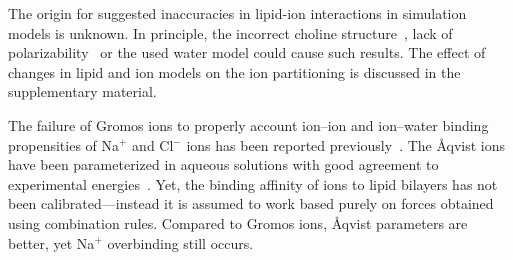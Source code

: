 \documentclass[pre,aps,floatfix,authordate1-4,twocolumn]{revtex4-1}
\begin{document}

The origin for suggested inaccuracies in lipid-ion interactions in simulation models is unknown. 
In principle, the incorrect choline structure~\cite{botan15}, lack of polarizability~\cite{leontyev11} or
the used water model could cause such results. The effect of changes in lipid and ion models on the ion
partitioning is discussed in the supplementary material.

The failure
 of Gromos ions to properly account ion--ion and ion--water binding propensities of Na$^+$ and Cl$^-$ ions has been
 reported previously~\cite{Reif13}. The \r{A}qvist ions have been parameterized in aqueous solutions with good agreement
 to experimental energies~\cite{Aaqvist90}. Yet, the binding affinity of ions to lipid bilayers has not been
 calibrated---instead it is assumed to work based purely on forces obtained using combination rules. Compared to Gromos
 ions, \r{A}qvist parameters are better, yet Na$^+$ overbinding still occurs.



\end{document}
